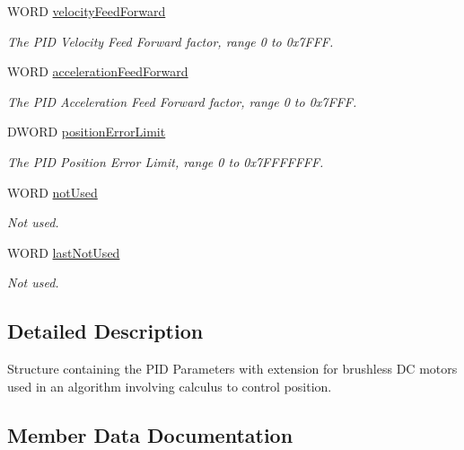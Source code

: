 \begin{DoxyCompactItemize}
W\+O\+RD \hyperlink{struct_m_o_t___brushless_position_loop_parameters_a227b7aa43a07b6019f1fd76cc102c326}{velocity\+Feed\+Forward}
\begin{DoxyCompactList}\small\item\em The P\+ID Velocity Feed Forward factor, range 0 to 0x7\+F\+FF. \end{DoxyCompactList}\item 
W\+O\+RD \hyperlink{struct_m_o_t___brushless_position_loop_parameters_ad09f38fe38669005c7ab3710b1921771}{acceleration\+Feed\+Forward}
\begin{DoxyCompactList}\small\item\em The P\+ID Acceleration Feed Forward factor, range 0 to 0x7\+F\+FF. \end{DoxyCompactList}\item 
D\+W\+O\+RD \hyperlink{struct_m_o_t___brushless_position_loop_parameters_aeee6491fcd07f9a0529b712020077ab4}{position\+Error\+Limit}
\begin{DoxyCompactList}\small\item\em The P\+ID Position Error Limit, range 0 to 0x7\+F\+F\+F\+F\+F\+FF. \end{DoxyCompactList}\item 
W\+O\+RD \hyperlink{struct_m_o_t___brushless_position_loop_parameters_a492dc6e0cf1cca46368de3cc1cdecbbf}{not\+Used}
\begin{DoxyCompactList}\small\item\em Not used. \end{DoxyCompactList}\item 
W\+O\+RD \hyperlink{struct_m_o_t___brushless_position_loop_parameters_aa912da6b9131a30e8830ab4ef0d5a88b}{last\+Not\+Used}
\begin{DoxyCompactList}\small\item\em Not used. \end{DoxyCompactList}\end{DoxyCompactItemize}


\subsection{Detailed Description}
Structure containing the P\+ID Parameters with extension for brushless DC motors used in an algorithm involving calculus to control position. 



\subsection{Member Data Documentation}
